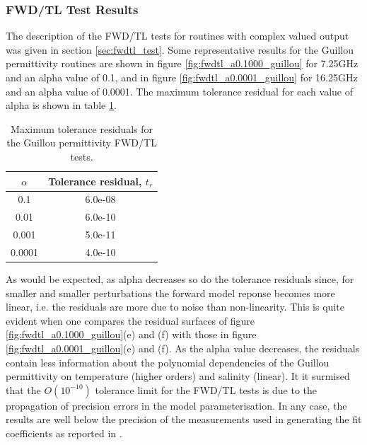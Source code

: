 \subsubsection{FWD/TL Test Results}
\label{sec:fwdtl_guillou}
The description of the FWD/TL tests for routines with complex valued output was given in section \ref{sec:fwdtl_test}. Some representative results for the Guillou permittivity routines are shown in figure \ref{fig:fwdtl_a0.1000_guillou} for 7.25GHz and an alpha value of 0.1, and in figure \ref{fig:fwdtl_a0.0001_guillou} for 16.25GHz and an alpha value of 0.0001. The maximum tolerance residual for each value of alpha is shown in table \ref{tab:fwdtl_guillou_alpha}.
\begin{table}[htp]
  \centering
  \begin{tabular}{| c | c |}
    \hline
    \boldmath$\alpha$\unboldmath & \textbf{Tolerance residual,} \boldmath$t_r$\unboldmath \\
    \hline\hline
    0.1    & 6.0e-08 \\
    0.01   & 6.0e-10 \\
    0.001  & 5.0e-11 \\
    0.0001 & 4.0e-10 \\
    \hline
  \end{tabular}
  \caption{Maximum tolerance residuals for the Guillou permittivity FWD/TL tests.}
  \label{tab:fwdtl_guillou_alpha}
\end{table}
As would be expected, as alpha decreases so do the tolerance residuals since, for smaller and smaller perturbations the forward model reponse becomes more linear, i.e. the residuals are more due to noise than non-linearity. This is quite evident when one compares the residual surfaces of figure \ref{fig:fwdtl_a0.1000_guillou}(e) and (f) with those in figure \ref{fig:fwdtl_a0.0001_guillou}(e) and (f). As the alpha value decreases, the residuals contain less information about the polynomial dependencies of the Guillou permittivity on temperature (higher orders) and salinity (linear). It it surmised that the $O(10^{-10})$ tolerance limit for the FWD/TL tests is due to the propagation of precision errors in the model parameterisation. In any case, the results are well below the precision of the measurements used in generating the fit coefficients as reported in \cite{Guillou_etal_1998}.

